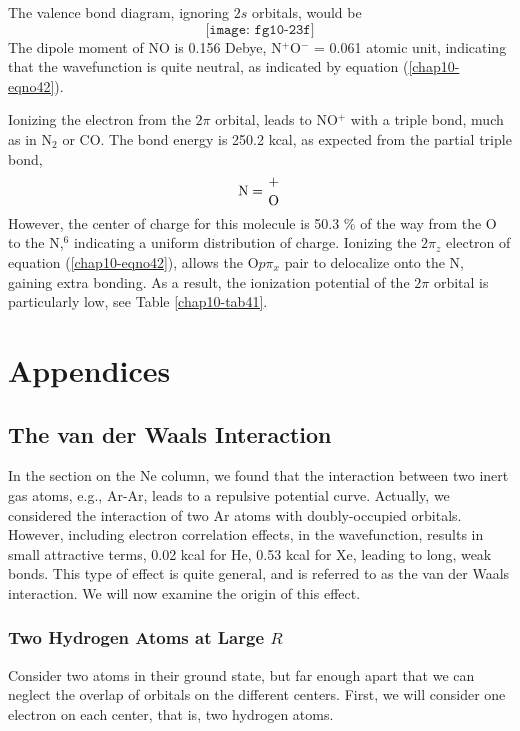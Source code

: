 The valence bond diagram, ignoring $2s$ orbitals, would be
\begin{equation}
\texttt{[image: fg10-23f]}
\label{chap10-eqno42}
\end{equation}
The dipole moment of NO is 0.156 Debye, N$^+$O$^-$ = 0.061 atomic
unit, indicating that the wavefunction is quite neutral, as indicated
by equation (\ref{chap10-eqno42}).

Ionizing the electron from the $2 \pi$ orbital, leads to NO$^+$ with a 
triple bond, much as in N$_2$ or CO.  The bond energy is 250.2 kcal, 
as expected from the partial triple bond,
\begin{equation}
{\rm N} = {+ \atop {\rm O}}
\end{equation}
However, the center of charge for this molecule is 50.3 \% of the way
from the O to the N,$^6$ indicating a uniform distribution of charge.
Ionizing the $2\pi_z$ electron of equation (\ref{chap10-eqno42}),
allows the O$p\pi_x$ pair to delocalize onto the N, gaining extra
bonding.  As a result, the ionization potential of the $2\pi$ orbital
is particularly low, see Table \ref{chap10-tab41}.

\section{Appendices}

\subsection{The van der Waals Interaction}
\label{chap10-app-a}

In the section on the Ne column, we found that the interaction between two inert 
gas atoms, e.g., Ar-Ar, leads to a repulsive potential 
curve.  Actually, we considered the interaction of two Ar
atoms with doubly-occupied orbitals.  However, including 
electron correlation effects, in the wavefunction, results 
in small attractive terms, 0.02 kcal for He, 0.53 kcal 
for Xe, leading to long, weak bonds. This type of effect 
is quite general, and is referred to as the van der Waals 
interaction.  We will now examine the origin of this 
effect. 

\subsubsection{Two Hydrogen Atoms at Large $R$}
	 
Consider two atoms in their ground state, but far enough 
apart that we can neglect the overlap of orbitals on the 
different centers.  First, we will consider one electron 
on each center, that is, two hydrogen atoms.
	
